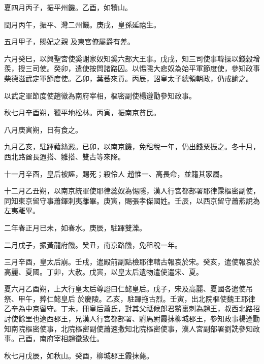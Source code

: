 \begin{pinyinscope}
 夏四月丙子，振平州饑。乙酉，如犢山。



 閏月丙午，振平、灣二州饑。庚戌，皇孫延禧生。



 五月甲子，賜妃之親
 及東宮僚屬爵有差。



 六月癸巳，以興聖宮使奚謝家奴知奚六部大王事。戊戌，知三司使事韓操以錢穀增羨，授三司使。癸卯，遣使按問諸路囚。以惕隱大悲奴為始平軍節度使，參知政事柴德滋武定軍節度使。乙卯，葉蕃來貢。丙辰，詔皇太子總領朝政，仍戒諭之。



 以武定軍節度使趙徽為南府宰相，樞密副使楊遵勖參知政事。



 秋七月辛酉朔，獵平地松林。丙寅，振南京貧民。



 八月庚寅朔，日有食之。



 九月乙亥，駐蹕藉絲澱。已卯，以南京饑，免租稅一年，仍出錢粟振之。冬十月，西北路酋長遐搭、雛搭、雙古等來降。



 十一月辛酉，皇后被誣，賜死；殺伶人
 趙惟一、高長命，並籍其家屬。



 十二月乙丑朔，以南京統軍使耶律蕊奴為惕隱，漢人行宮都部署耶律霂樞密副使，同知東京留守事蕭鐸刺夷離畢。庚寅，賜張孝傑國姓。壬辰，以西京留守蕭燕說為左夷離畢。



 二年春正月已未，如春水。庚辰，駐蹕雙濼。



 二月戊子，振黃龍府饑。癸丑，南京路饑，免租稅一年。



 三月辛酉，皇太后崩。壬戌，遣殿前副點檢耶律轄古報哀於宋。癸亥，遣使報哀於高麗、夏國。丁卯，大赦。戊寅，以皇太后遺物遣使遣宋、夏。



 夏六月乙酉朔，上大行皇太后尊謚曰仁懿皇后。戊子，宋及高麗、夏國各遣使吊祭、甲午，葬仁懿皇后
 於慶陵。乙亥，駐蹕拖古烈。壬寅，出北院樞使魏王耶律乙辛為中京留守。丁未，冊皇后蕭氏，對其父祗候郎君鱉裏刺為趙王，叔西北路招討使餘里也遼西郡王，兄漢人行宮都部署、駙馬尉霞抹柳城郡王，參知政事楊遵勖知南院樞密使事，北院樞密副使蕭速撒知北院樞密使事，漢人宮副部署劉詵參知政事。己酉，南府宰相趙徽致仕。



 秋七月戊辰，如秋山。癸酉，柳城郡王霞抹薨。




\end{pinyinscope}
